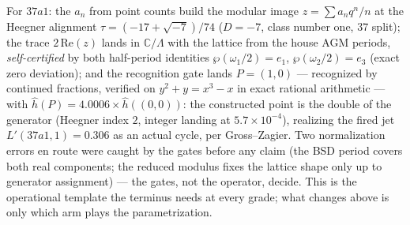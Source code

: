 \documentclass[11pt]{article}
\theoremstyle{definition}
\theoremstyle{remark}
\begin{document}
For $37a1$: the $a_n$ from point counts build the modular image
$z=\sum a_n q^n/n$ at the Heegner alignment $\tau=(-17+\sqrt{-7})/74$
($D=-7$, class number one, $37$ split); the trace $2\,\mathrm{Re}(z)$ lands in
$\mathbb C/\Lambda$ with the lattice from the house AGM periods,
\emph{self-certified} by both half-period identities
$\wp(\omega_1/2)=e_1$, $\wp(\omega_2/2)=e_3$ (exact zero deviation); and the
recognition gate lands $P=(1,0)$ --- recognized by continued fractions,
verified on $y^2+y=x^3-x$ in exact rational arithmetic --- with
$\hat h(P)=4.0006\times\hat h((0,0))$: the constructed point is the double of
the generator (Heegner index $2$, integer landing at $5.7\times10^{-4}$),
realizing the fired jet $L'(37a1,1)=0.306$ as an actual cycle, per
Gross--Zagier. Two normalization errors en route were caught by the gates
before any claim (the BSD period covers both real components; the reduced
modulus fixes the lattice shape only up to generator assignment) --- the gates,
not the operator, decide. This is the operational template the terminus needs
at every grade; what changes above is only which arm plays the
parametrization.
\end{document}
